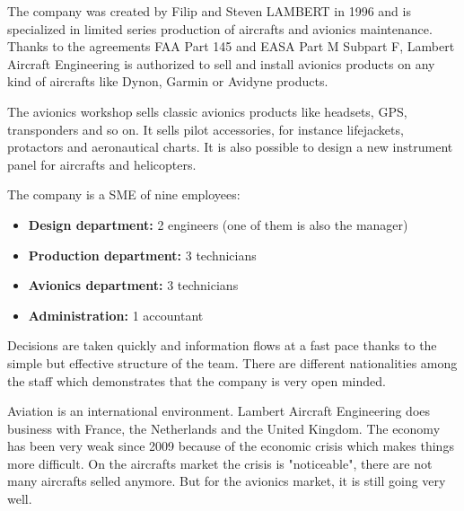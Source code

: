 \documentclass[11pt,a4paper]{article}
\begin{document}
The company was created by Filip and Steven LAMBERT in 1996 and is specialized in limited series production of aircrafts and avionics maintenance. Thanks to the agreements FAA Part 145 and EASA Part M Subpart F, Lambert Aircraft Engineering is authorized to sell and install avionics products on any kind of aircrafts like Dynon, Garmin or Avidyne products.

\bigskip

The avionics workshop sells classic avionics products like headsets, GPS, transponders and so on. It sells pilot accessories, for instance lifejackets, protactors and aeronautical charts. It is also possible to design a new instrument panel for aircrafts and helicopters.

\bigskip

The company is a SME of nine employees:
\begin{itemize}
\setlength{\itemsep}{0pt}
\item \textbf{Design department:} 2 engineers (one of them is also the manager)
\item \textbf{Production department:} 3 technicians
\item \textbf{Avionics department:} 3 technicians
\item \textbf{Administration:} 1 accountant
\end{itemize}

Decisions are taken quickly and information flows at a fast pace thanks to the simple but effective structure of the team.  There are different nationalities among the staff which demonstrates that the company is very open minded.

\bigskip

Aviation is an international environment. Lambert Aircraft Engineering does business with France, the Netherlands and the United Kingdom. The economy has been very weak since 2009 because of the economic crisis which makes things more difficult. On the aircrafts market the crisis is "noticeable", there are not many aircrafts selled anymore. But for the avionics market, it is still going very well.

\newpage
\end{document}
